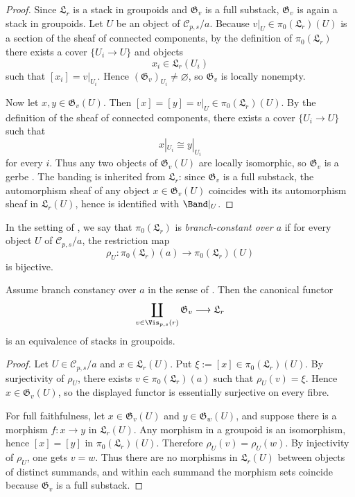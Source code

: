 \begin{proof}
Since $\mathfrak L_r$ is a stack in groupoids and $\mathfrak G_v$ is a full substack, $\mathfrak G_v$ is again a stack in groupoids. Let $U$ be an object of $\mathcal C_{p,s}/a$. Because $v|_U\in \pi_0(\mathfrak L_r)(U)$ is a section of the sheaf of connected components, by the definition of $\pi_0(\mathfrak L_r)$ there exists a cover $\{U_i\to U\}$ and objects
\[
x_i\in \mathfrak L_r(U_i)
\]
such that $[x_i]=v|_{U_i}$. Hence $(\mathfrak G_v)_{U_i}\neq\varnothing$, so $\mathfrak G_v$ is locally nonempty.

Now let $x,y\in \mathfrak G_v(U)$. Then $[x]=[y]=v|_U\in \pi_0(\mathfrak L_r)(U)$. By the definition of the sheaf of connected components, there exists a cover $\{U_i\to U\}$ such that
\[
x|_{U_i}\cong y|_{U_i}
\]
for every $i$. Thus any two objects of $\mathfrak G_v(U)$ are locally isomorphic, so $\mathfrak G_v$ is a gerbe \cite[Tag 06NY]{StacksProject}. The banding is inherited from $\mathfrak L_r$: since $\mathfrak G_v$ is a full substack, the automorphism sheaf of any object $x\in \mathfrak G_v(U)$ coincides with its automorphism sheaf in $\mathfrak L_r(U)$, hence is identified with $\Band|_U$.
\end{proof}

\begin{definition}\label{def:branch-constancy}
In the setting of , we say that $\pi_0(\mathfrak L_r)$ is \emph{branch-constant over $a$} if for every object $U$ of $\mathcal C_{p,s}/a$, the restriction map
\[
\rho_U:\pi_0(\mathfrak L_r)(a)\longrightarrow \pi_0(\mathfrak L_r)(U)
\]
is bijective.
\end{definition}

\begin{corollary}\label{cor:branch-decomposition}
Assume branch constancy over $a$ in the sense of . Then the canonical functor
\[
\coprod_{v\in \Vis_{p,s}(r)} \mathfrak G_v\longrightarrow \mathfrak L_r
\]
is an equivalence of stacks in groupoids.
\end{corollary}

\begin{proof}
Let $U\in \mathcal C_{p,s}/a$ and $x\in \mathfrak L_r(U)$. Put $\xi:=[x]\in \pi_0(\mathfrak L_r)(U)$. By surjectivity of $\rho_U$, there exists $v\in \pi_0(\mathfrak L_r)(a)$ such that $\rho_U(v)=\xi$. Hence $x\in \mathfrak G_v(U)$, so the displayed functor is essentially surjective on every fibre.

For full faithfulness, let $x\in \mathfrak G_v(U)$ and $y\in \mathfrak G_w(U)$, and suppose there is a morphism $f:x\to y$ in $\mathfrak L_r(U)$. Any morphism in a groupoid is an isomorphism, hence $[x]=[y]$ in $\pi_0(\mathfrak L_r)(U)$. Therefore $\rho_U(v)=\rho_U(w)$. By injectivity of $\rho_U$, one gets $v=w$. Thus there are no morphisms in $\mathfrak L_r(U)$ between objects of distinct summands, and within each summand the morphism sets coincide because $\mathfrak G_v$ is a full substack.
\end{proof}

